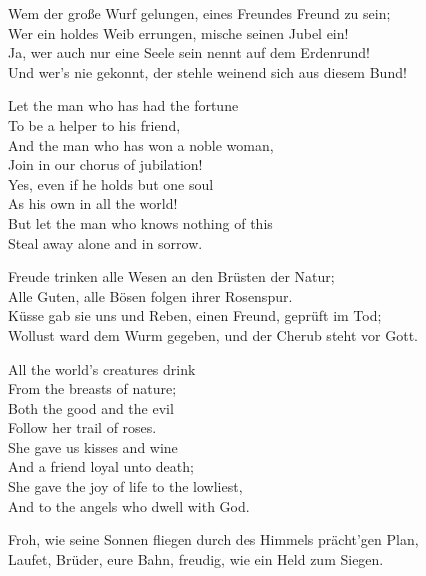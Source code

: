 \begin{paracol}{4}
\begin{Gverse}
Wem der gro{\ss}e Wurf gelungen,
eines Freundes Freund zu sein;\\
Wer ein holdes Weib errungen,
mische seinen Jubel ein!\\
Ja, wer auch nur eine Seele 
sein nennt auf dem Erdenrund!\\
Und wer's nie gekonnt, der stehle 
weinend sich aus diesem Bund! 
\end{Gverse}
\begin{Everse}
Let the man who has had the fortune\\
To be a helper to his friend,\\
And the man who has won a noble woman,\\
Join in our chorus of jubilation!\\
Yes, even if he holds but one soul\\
As his own in all the world!\\
But let the man who knows nothing of this\\
Steal away alone and in sorrow.
\end{Everse}
\begin{Gverse}
Freude trinken alle Wesen
an den Br\"usten der Natur;\\
Alle Guten, alle B\"osen
folgen ihrer Rosenspur.\\
K\"usse gab sie uns und Reben,
einen Freund, gepr\"uft im Tod;\\
Wollust ward dem Wurm gegeben,
und der Cherub steht vor Gott. 
\end{Gverse}
\begin{Everse}
All the world's creatures drink\\
From the breasts of nature;\\
Both the good and the evil\\
Follow her trail of roses.\\
She gave us kisses and wine\\
And a friend loyal unto death;\\
She gave the joy of life to the lowliest,\\
And to the angels who dwell with God. 
\end{Everse}
\begin{Gverse}
Froh, wie seine Sonnen fliegen 
durch des Himmels pr\"acht'gen Plan,\\
Laufet, Br\"uder, eure Bahn,
freudig, wie ein Held zum Siegen. 
\end{Gverse}
\begin{Everse}

\end{Everse}
\end{paracol}
